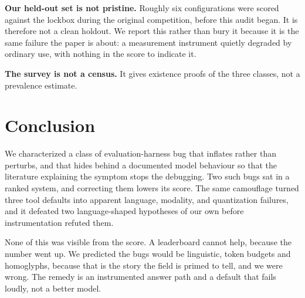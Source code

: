 \documentclass{article}
\begin{document}
\textbf{Our held-out set is not pristine.} Roughly six configurations were scored against the lockbox during the original competition, before this audit began. It is therefore not a clean holdout. We report this rather than bury it because it is the same failure the paper is about: a measurement instrument quietly degraded by ordinary use, with nothing in the score to indicate it.

\textbf{The survey is not a census.} It gives existence proofs of the three classes, not a prevalence estimate.

\section{Conclusion}

We characterized a class of evaluation-harness bug that inflates rather than perturbs, and that hides behind a documented model behaviour so that the literature explaining the symptom stops the debugging. Two such bugs sat in a ranked system, and correcting them lowers its score. The same camouflage turned three tool defaults into apparent language, modality, and quantization failures, and it defeated two language-shaped hypotheses of our own before instrumentation refuted them.

None of this was visible from the score. A leaderboard cannot help, because the number went up. We predicted the bugs would be linguistic, token budgets and homoglyphs, because that is the story the field is primed to tell, and we were wrong. The remedy is an instrumented answer path and a default that fails loudly, not a better model.



\end{document}
